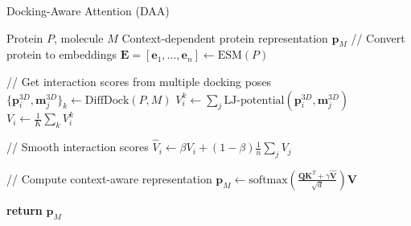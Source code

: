 \begin{algorithm}[ht]
\caption{Docking-Aware Attention (DAA)}
\label{algo:daa}
\begin{algorithmic}[1]
\Require Protein  $P$, molecule $M$
\Ensure Context-dependent protein representation $\mathbf{p}_M$
\State // Convert protein to embeddings
\State $\mathbf{E} = [\mathbf{e}_1, \ldots, \mathbf{e}_n] \gets \text{ESM}(P)$

\State // Get interaction scores from multiple docking poses
\For
   \State $\{\mathbf{p}_i^{3D}, \mathbf{m}_j^{3D}\}_k \gets \text{DiffDock}(P, M)$
   \State $V_i^k \gets \sum_j \text{LJ-potential}(\mathbf{p}_i^{3D}, \mathbf{m}_j^{3D})$
\EndFor
\State $V_i \gets \frac{1}{K}\sum_k V_i^k$ 

\State // Smooth interaction scores
\State $\hat{V}_i \gets \beta V_i + (1-\beta)\frac{1}{n}\sum_j V_j$

\State // Compute context-aware representation
\State $\mathbf{p}_M \gets \text{softmax}\left(\frac{\mathbf{Q}\mathbf{K}^T + \gamma\hat{\mathbf{V}}}{\sqrt{d}}\right)\mathbf{V}$

\State \textbf{return} $\mathbf{p}_M$
\end{algorithmic}
\end{algorithm}
